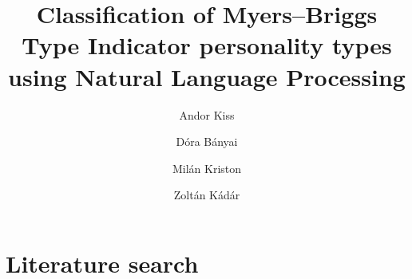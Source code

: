 \documentclass[runningheads]{llncs}
\begin{document}
%
\title{Classification of Myers–Briggs Type Indicator personality types using Natural Language Processing}
%
%
\author{Andor Kiss \and
Dóra Bányai \and
Milán Kriston \and
Zoltán Kádár}
%


\maketitle
\section{Literature search}
\end{document}
